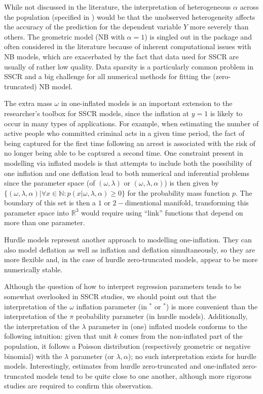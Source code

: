 \documentclass[
]{jss}
\newcommand{\1}{\mathcal{I}} \newcommand{\bZero}{\boldsymbol{0}}
\begin{document}
While not discussed in the literature, the interpretation of
heterogeneous \(\alpha\) across the population (specified in
) would be that the unobserved heterogeneity affects
the accuracy of the prediction for the dependent variable \(Y\) more
severely than others. The geometric model (NB with \(\alpha=1\)) is
singled out in the package and often considered in the literature
because of inherent computational issues with NB models, which are
exacerbated by the fact that data used for SSCR are usually of rather
low quality. Data sparsity is a particularly common problem in SSCR and
a big challenge for all numerical methods for fitting the
(zero-truncated) NB model.

The extra mass \(\omega\) in one-inflated models is an important
extension to the researcher's toolbox for SSCR models, since the
inflation at \(y=1\) is likely to occur in many types of applications.
For example, when estimating the number of active people who committed
criminal acts in a given time period, the fact of being captured for the
first time following an arrest is associated with the risk of no longer
being able to be captured a second time. One constraint present in
modelling via inflated models is that attempts to include both the
possibility of one inflation and one deflation lead to both numerical
and inferential problems since the parameter space (of
\((\omega, \lambda)\) or \((\omega, \lambda, \alpha)\)) is then given by
\(\{(\omega, \lambda, \alpha) | \forall x\in \mathbb{N}: p(x|\omega, \lambda, \alpha)\geq0\}\)
for the probability mass function \(p\). The boundary of this set is
then a \(1\) or \(2-\)dimentional manifold, transforming this parameter
space into \(\mathbb{R}^{3}\) would require using ``link'' functions
that depend on more than one parameter.

Hurdle models represent another approach to modelling one-inflation.
They can also model deflation as well as inflation and deflation
simultaneously, so they are more flexible and, in the case of hurdle
zero-truncated models, appear to be more numerically stable.

Although the question of how to interpret regression parameters tends to
be somewhat overlooked in SSCR studies, we should point out that the
interpretation of the \(\omega\) inflation parameter (in
\(^\ast\) or \(^\ast\)) is more convenient than
the interpretation of the \(\pi\) probability parameter (in hurdle
models). Additionally, the interpretation of the \(\lambda\) parameter
in (one) inflated models conforms to the following intuition: given that
unit \(k\) comes from the non-inflated part of the population, it
follows a Poisson distribution (respectively geometric or negative
binomial) with the \(\lambda\) parameter (or \(\lambda,\alpha\)); no
such interpretation exists for hurdle models. Interestingly, estimates
from hurdle zero-truncated and one-inflated zero-truncated models tend
to be quite close to one another, although more rigorous studies are
required to confirm this observation.
\end{document}
